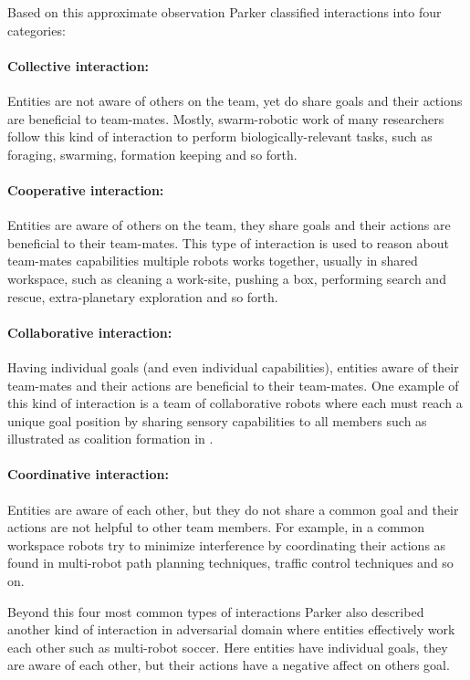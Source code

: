 Based on this approximate observation Parker classified interactions into four categories:
\paragraph{Collective interaction:}
Entities are not aware of others on the team, yet do share goals and their actions are beneficial to team-mates. Mostly, swarm-robotic work of many researchers follow this kind of interaction to perform biologically-relevant tasks, such as foraging, swarming, formation keeping and so forth.

\paragraph{Cooperative interaction:}
Entities are aware of others on the team, they share goals and their actions are beneficial to their team-mates. This type of interaction is used to reason about team-mates capabilities multiple robots works together, usually in shared workspace, such as cleaning a work-site, pushing a box, performing search and rescue, extra-planetary exploration and so forth. 

\paragraph{Collaborative interaction:}
 Having individual goals (and even individual capabilities), entities aware of their team-mates and their actions are beneficial to their team-mates. One example of this kind of interaction is a team of collaborative robots where each must reach a unique goal position by sharing sensory capabilities to all members such as illustrated as coalition formation in \cite{Parker+2006}.

\paragraph{Coordinative interaction:}
 Entities are  aware of each other, but they do not share a common goal and their actions are not helpful to other team members. For example, in a common workspace robots try to minimize interference by coordinating their actions as found in multi-robot path planning techniques, traffic control techniques and so on.

Beyond this four most common types of interactions Parker also described another kind of interaction in adversarial domain where  entities effectively work each other such as multi-robot soccer. Here entities have individual goals, they are aware of each other, but their actions have a negative affect on others goal.

